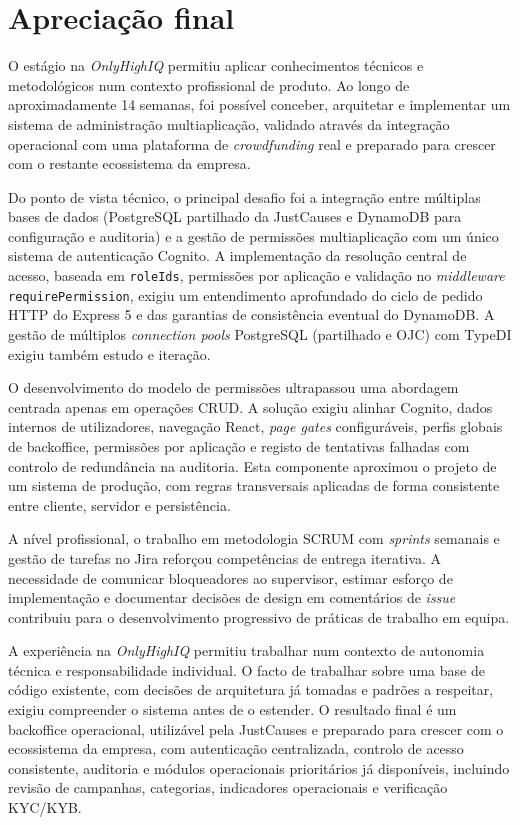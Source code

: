 
\section{Apreciação final}
\label{sec:apreciacao_final}

O estágio na \textit{OnlyHighIQ} permitiu aplicar conhecimentos técnicos e metodológicos num contexto profissional de produto. Ao longo de aproximadamente 14 semanas, foi possível conceber, arquitetar e implementar um sistema de administração multiaplicação, validado através da integração operacional com uma plataforma de \textit{crowdfunding} real e preparado para crescer com o restante ecossistema da empresa.

Do ponto de vista técnico, o principal desafio foi a integração entre múltiplas bases de dados (PostgreSQL partilhado da JustCauses e DynamoDB para configuração e auditoria) e a gestão de permissões multiaplicação com um único sistema de autenticação Cognito. A implementação da resolução central de acesso, baseada em \texttt{roleIds}, permissões por aplicação e validação no \textit{middleware} \texttt{requirePermission}, exigiu um entendimento aprofundado do ciclo de pedido HTTP do Express 5 e das garantias de consistência eventual do DynamoDB. A gestão de múltiplos \textit{connection pools} PostgreSQL (partilhado e OJC) com TypeDI exigiu também estudo e iteração.

O desenvolvimento do modelo de permissões ultrapassou uma abordagem centrada apenas em operações \gls{CRUD}. A solução exigiu alinhar Cognito, dados internos de utilizadores, navegação React, \textit{page gates} configuráveis, perfis globais de backoffice, permissões por aplicação e registo de tentativas falhadas com controlo de redundância na auditoria. Esta componente aproximou o projeto de um sistema de produção, com regras transversais aplicadas de forma consistente entre cliente, servidor e persistência.

A nível profissional, o trabalho em metodologia SCRUM com \textit{sprints} semanais e gestão de tarefas no Jira reforçou competências de entrega iterativa. A necessidade de comunicar bloqueadores ao supervisor, estimar esforço de implementação e documentar decisões de design em comentários de \textit{issue} contribuiu para o desenvolvimento progressivo de práticas de trabalho em equipa.

A experiência na \textit{OnlyHighIQ} permitiu trabalhar num contexto de autonomia técnica e responsabilidade individual. O facto de trabalhar sobre uma base de código existente, com decisões de arquitetura já tomadas e padrões a respeitar, exigiu compreender o sistema antes de o estender. O resultado final é um backoffice operacional, utilizável pela JustCauses e preparado para crescer com o ecossistema da empresa, com autenticação centralizada, controlo de acesso consistente, auditoria e módulos operacionais prioritários já disponíveis, incluindo revisão de campanhas, categorias, indicadores operacionais e verificação \gls{KYC}/\gls{KYB}.
